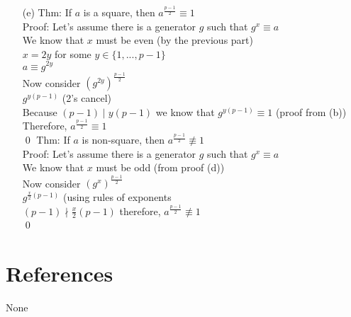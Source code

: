 \documentclass[11pt]{article}
\theoremstyle{definition}
\begin{document}
\begin{enumerate}
	\item[(e)]
	Thm: If $a$ is a square, then $a^{\frac{p-1}{2}} \equiv 1$\\
	\newline
	Proof: Let's assume there is a generator $g$ such that $g^x \equiv a$\\
	We know that $x$ must be even (by the previous part)\\
	$x = 2y$ for some $y \in \{1,...,p-1\}$\\
	$a \equiv g^{2y}$\\
	Now consider $(g^{2y})^{\frac{p-1}{2}}$\\
	$g^{y(p-1)}$ (2's cancel)\\
	Because $(p-1) \mid y(p-1)$ we know that $g^{y(p-1)} \equiv 1$ (proof from (b))\\
	Therefore, $a^{\frac{p-1}{2}} \equiv 1$\\
	\qed
	\newline
	Thm: If $a$ is non-square, then $a^{\frac{p-1}{2}} \not\equiv 1$\\
	\newline
	Proof: Let's assume there is a generator $g$ such that $g^x \equiv a$\\
	We know that $x$ must be odd (from proof (d))\\
	Now consider $(g^{x})^{\frac{p-1}{2}}$\\
	$g^{\frac{x}{2}(p-1)}$ (using rules of exponents\\
	$(p-1) \nmid \frac{x}{2}(p-1)$ therefore, $a^{\frac{p-1}{2}} \not\equiv 1$\\
	\qed




\end{enumerate}


\noindent\hrulefill


\section*{References}

None
\end{document}
